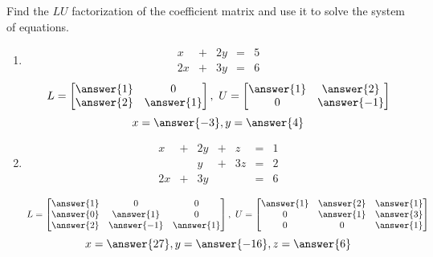 \documentclass{ximera}
\author{Zack Reed}
\begin{document}
\begin{problem}
Find the $LU$ factorization of the coefficient matrix and use it to solve the system of equations.
 
\begin{enumerate}
 
\item $$
\begin{array}{ccccc}
      x& +&2y&=&5\\
      2x & +&3y&= &6
    \end{array}
$$
$$L=\begin{bmatrix}\answer{1}&0\\\answer{2}&\answer{1}\end{bmatrix},\quad U=\begin{bmatrix}\answer{1}&\answer{2}\\0&\answer{-1}\end{bmatrix}$$
$$x=\answer{-3}, y=\answer{4}$$

 
\item $$\begin{array}{ccccccc}
      x & +&2y&+&z&= &1 \\
     & &y&+&3z&=&2\\
     2x& +&3y&&&=&6
    \end{array}$$

    $$L=\begin{bmatrix}\answer{1}&0&0\\\answer{0}&\answer{1}&0\\\answer{2}&\answer{-1}&\answer{1}\end{bmatrix},\quad U=\begin{bmatrix} \answer{1}&\answer{2}&\answer{1}\\0&\answer{1}&\answer{3}\\0&0&\answer{1}\end{bmatrix}$$
    $$x=\answer{27},y=\answer{-16}, z=\answer{6}$$

\end{enumerate}

\end{problem}
 
\end{document}

